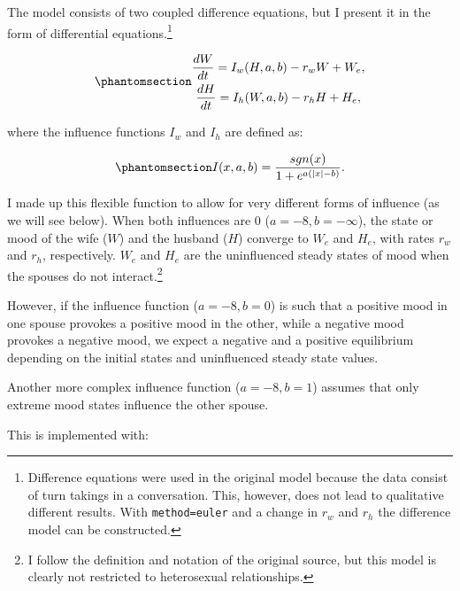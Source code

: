 \documentclass[
  a4paper,
  DIV=11,
  numbers=noendperiod,
  oneside]{scrreprt}
\begin{document}
The model consists of two coupled difference equations, but I present it
in the form of differential equations.\footnote{Difference equations
  were used in the original model because the data consist of turn
  takings in a conversation. This, however, does not lead to qualitative
  different results. With
  \texttt{method=\textquotesingle{}euler\textquotesingle{}} and a change
  in \(r_{w}\) and \(r_{h}\) the difference model can be constructed.}

\begin{equation}\phantomsection\label{eq-ch4n-11-old-31}{
\begin{gathered}
\frac{dW}{dt} = I_{w}(H,a,b) - r_{w}W + W_{e}, \\
\frac{dH}{dt} = I_{h}(W,a,b) - r_{h}H + H_{e},
\end{gathered}
}\end{equation}

where the influence functions \(I_{w}\) and \(I_{h}\) are defined as:

\begin{equation}\phantomsection\label{eq-ch4n-12-old-32}{
I(x,a,b) = \frac{sgn(x)}{1 + e^{a\left( |x| - b \right)}}.
}\end{equation}

I made up this flexible function to allow for very different forms of
influence (as we will see below). When both influences are 0
(\(a = - 8,b = - \infty\)), the state or mood of the wife (\(W\)) and
the husband (\(H\)) converge to \(W_{e}\) and \(H_{e}\), with rates
\(r_{w}\) and \(r_{h}\), respectively. \(W_{e}\) and \(H_{e}\) are the
uninfluenced steady states of mood when the spouses do not
interact.\footnote{I follow the definition and notation of the original
  source, but this model is clearly not restricted to heterosexual
  relationships.}

However, if the influence function (\(a = - 8, b = 0\)) is such that a
positive mood in one spouse provokes a positive mood in the other, while
a negative mood provokes a negative mood, we expect a negative and a
positive equilibrium depending on the initial states and uninfluenced
steady state values.

Another more complex influence function (\(a = - 8, b = 1\)) assumes
that only extreme mood states influence the other spouse.

This is implemented with:
\end{document}

